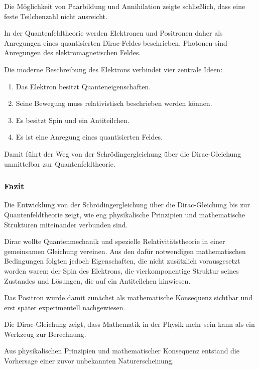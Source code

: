 Die Möglichkeit von Paarbildung und Annihilation zeigte schließlich,
dass eine feste Teilchenzahl nicht ausreicht.

In der Quantenfeldtheorie werden Elektronen und Positronen daher als
Anregungen eines quantisierten Dirac-Feldes beschrieben. Photonen sind
Anregungen des elektromagnetischen Feldes.

\begin{PhysicsBox}
	\label{box:vom_elektron_zum_quantenfeld}
	
	Die moderne Beschreibung des Elektrons verbindet vier zentrale Ideen:
	
	\begin{enumerate}
		\item Das Elektron besitzt Quanteneigenschaften.
		\item Seine Bewegung muss relativistisch beschrieben werden können.
		\item Es besitzt Spin und ein Antiteilchen.
		\item Es ist eine Anregung eines quantisierten Feldes.
	\end{enumerate}
	
	Damit führt der Weg von der Schrödingergleichung über die
	Dirac-Gleichung unmittelbar zur Quantenfeldtheorie.
\end{PhysicsBox}

\subsubsection*{Fazit}

Die Entwicklung von der Schrödingergleichung über die Dirac-Gleichung
bis zur Quantenfeldtheorie zeigt, wie eng physikalische Prinzipien und
mathematische Strukturen miteinander verbunden sind.

Dirac wollte Quantenmechanik und spezielle Relativitätstheorie in einer
gemeinsamen Gleichung vereinen. Aus den dafür notwendigen
mathematischen Bedingungen folgten jedoch Eigenschaften, die nicht
zusätzlich vorausgesetzt worden waren: der Spin des Elektrons, die
vierkomponentige Struktur seines Zustandes und Lösungen, die auf ein
Antiteilchen hinwiesen.

Das Positron wurde damit
zunächst als mathematische Konsequenz sichtbar und erst später
experimentell nachgewiesen.

\begin{HistoryBox}
	\label{box:mathematik_als_wegweiser_dirac}
	
	Die Dirac-Gleichung zeigt, dass Mathematik in der Physik mehr sein kann
	als ein Werkzeug zur Berechnung.
	
	Aus physikalischen Prinzipien und mathematischer Konsequenz entstand
	die Vorhersage einer zuvor unbekannten Naturerscheinung.
\end{HistoryBox}

